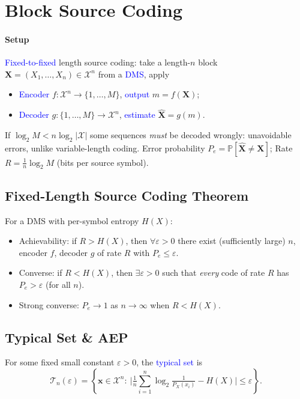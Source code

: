 \section{Block Source Coding}
\paragraph{Setup}
\textcolor{Blue}{Fixed-to-fixed} length source coding: take a length-$n$
block $\mathbf{X}=(X_1,\ldots,X_n)\in\mathcal{X}^n$ from a
\textcolor{Blue}{DMS}, apply
\begin{itemize}
  \item \textcolor{Blue}{Encoder} $f:\mathcal X^n\to\{1,\ldots,M\}$, \textcolor{Blue}{output} $m=f(\mathbf X)$;
  \item \textcolor{Blue}{Decoder} $g:\{1,\ldots,M\}\to\mathcal X^n$, \textcolor{Blue}{estimate} $\hat{\mathbf X}=g(m)$.
\end{itemize}
If $\log_2 M<n\log_2|\mathcal X|$ some sequences \emph{must} be decoded wrongly: unavoidable errors, unlike variable-length coding.
\textcolor{Bittersweet}{Error probability} $P_e=\mathbb{P}[\hat{\mathbf X}\neq\mathbf X]$; \textcolor{Bittersweet}{Rate} $R=\tfrac{1}{n}\log_2 M$ (bits per source symbol).

\subsection{Fixed-Length Source Coding Theorem}
For a DMS with per-symbol entropy $H(X)$:
\begin{itemize}
  \item \textcolor{Bittersweet}{Achievability}: if $R>H(X)$, then $\forall\varepsilon>0$
    there exist (sufficiently large) $n$, encoder $f$, decoder $g$ of rate $R$ with
    $P_e\le\varepsilon$.
  \item \textcolor{Bittersweet}{Converse}: if $R<H(X)$, then $\exists\varepsilon>0$ such
    that \emph{every} code of rate $R$ has $P_e>\varepsilon$ (for all $n$).
  \item \textcolor{Bittersweet}{Strong converse}: $P_e\to 1$ as $n\to\infty$ when $R<H(X)$.
\end{itemize}

\subsection{Typical Set \& AEP}
For some fixed small constant $\varepsilon>0$, the \textcolor{Blue}{typical set} is
\[\mathcal{T}_n(\varepsilon)=\left\{\mathbf x\in\mathcal X^n:\ \Big|\tfrac{1}{n}\sum_{i=1}^{n}\log_2\tfrac{1}{P_X(x_i)}-H(X)\Big|\le\varepsilon\right\}.\]
